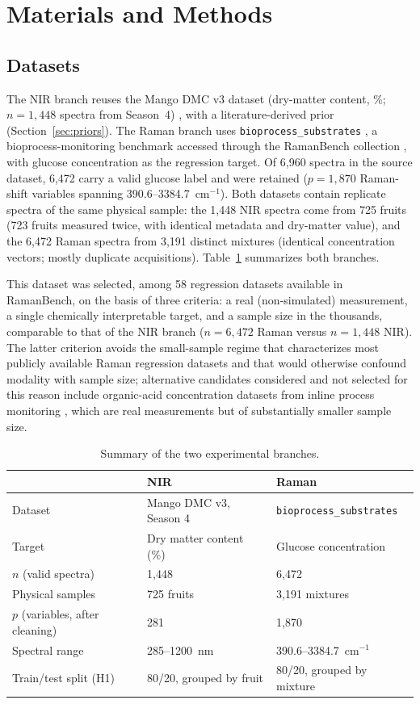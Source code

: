 \documentclass[preprint,12pt]{elsarticle}
\begin{document}
\section{Materials and Methods}
\label{sec:methods}

\subsection{Datasets}
\label{sec:datasets}

The NIR branch reuses the Mango DMC v3 dataset (dry-matter content, \%; $n=1{,}448$ spectra from Season~4) \cite{anderson2020}, with a literature-derived prior \cite{saranwong2004} (Section~\ref{sec:priors}). The Raman branch uses \texttt{bioprocess\_substrates} \cite{lange2026}, a bioprocess-monitoring benchmark accessed through the RamanBench collection \cite{koddenbrock2026}, with glucose concentration as the regression target. Of 6,960 spectra in the source dataset, 6,472 carry a valid glucose label and were retained ($p=1{,}870$ Raman-shift variables spanning 390.6--3384.7~cm$^{-1}$). Both datasets contain replicate spectra of the same physical sample: the 1,448 NIR spectra come from 725 fruits (723 fruits measured twice, with identical metadata and dry-matter value), and the 6,472 Raman spectra from 3,191 distinct mixtures (identical concentration vectors; mostly duplicate acquisitions). Table~\ref{tab:datasets} summarizes both branches.

This dataset was selected, among 58 regression datasets available in RamanBench, on the basis of three criteria: a real (non-simulated) measurement, a single chemically interpretable target, and a sample size in the thousands, comparable to that of the NIR branch ($n=6{,}472$ Raman versus $n=1{,}448$ NIR). The latter criterion avoids the small-sample regime that characterizes most publicly available Raman regression datasets and that would otherwise confound modality with sample size; alternative candidates considered and not selected for this reason include organic-acid concentration datasets from inline process monitoring \cite{echtermeyer2021}, which are real measurements but of substantially smaller sample size.

\begin{table}[htbp]
\centering
\caption{Summary of the two experimental branches.}
\label{tab:datasets}
\begin{tabular}{lll}
\toprule
& NIR & Raman \\
\midrule
Dataset & Mango DMC v3, Season 4 & \texttt{bioprocess\_substrates} \\
Target & Dry matter content (\%) & Glucose concentration \\
$n$ (valid spectra) & 1,448 & 6,472 \\
Physical samples & 725 fruits & 3,191 mixtures \\
$p$ (variables, after cleaning) & 281 & 1,870 \\
Spectral range & 285--1200~nm & 390.6--3384.7~cm$^{-1}$ \\
Train/test split (H1) & 80/20, grouped by fruit & 80/20, grouped by mixture \\
\bottomrule
\end{tabular}
\end{table}
\end{document}
